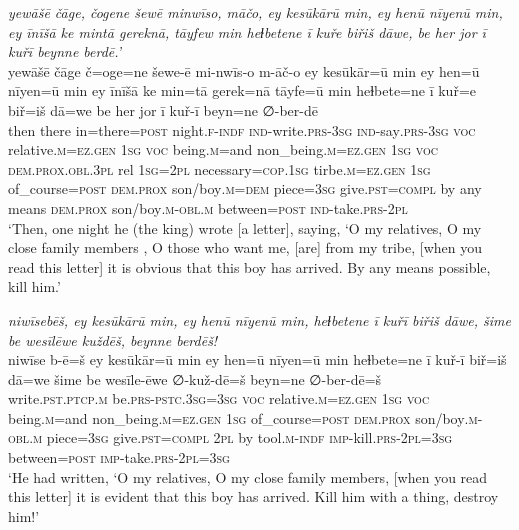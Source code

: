 \ea \label{KŠ.56}
\textit{yewāšē čāge, čogene šewē minwīso, māčo, ey kesūkārū min, ey henū nīyenū min, ey īnīšā ke mintā gereknā, tāyfew min heɫbetene ī kuře biřiš dāwe, be her jor ī kuřī beynne berdē.’} \\ 
\gll yewāšē čāge č=oge=ne šewe-ē mi-nwīs-o m-āč-o ey kesūkār=ū min ey hen=ū nīyen=ū min ey īnīšā ke min=tā gerek=nā tāyfe=ū min heɫbete=ne ī kuř=e biř=iš dā=we be her jor ī kuř-ī beyn=ne ∅-ber-dē \\ 
 then there in=there\textsc{=\textsc{post}} night\textsc{.f}\textsc{-indf} \textsc{ind-}write\textsc{.prs}\textsc{-3sg} \textsc{ind-}say\textsc{.prs}\textsc{-3sg} \textsc{voc} relative\textsc{.m}\textsc{\textsc{=ez.gen}} \textsc{1sg} \textsc{voc} being\textsc{.m}=and non\_being\textsc{.m}\textsc{\textsc{=ez.gen}} \textsc{1sg} \textsc{voc} \textsc{dem.prox}\textsc{.obl}\textsc{.3pl} rel \textsc{1sg}=\textsc{2pl} necessary\textsc{=cop}\textsc{.\textsc{1sg}} tirbe\textsc{.m}\textsc{\textsc{=ez.gen}} \textsc{1sg} of\_course\textsc{=\textsc{post}} \textsc{dem.prox} son/boy\textsc{.m}\textsc{=dem} piece\textsc{=3sg} give\textsc{.pst}\textsc{=compl} by any means \textsc{dem.prox} son/boy\textsc{.m}\textsc{-obl}\textsc{.m} between\textsc{=\textsc{post}} \textsc{ind-}take\textsc{.prs}-\textsc{2pl} \\ 
\glt `Then, one night he (the king) wrote [a letter], saying, ‘O my relatives, O my close family members , O those who want me, [are] from my tribe, [when you read this letter] it is obvious that this boy has arrived. By any means possible, kill him.'
\z 
 
\ea \label{KŠ.72}
\textit{niwīsebēš, ey kesūkārū min, ey henū nīyenū min, heɫbetene ī kuřī biřiš dāwe, šime be wesīlēwe kuždēš, beynne berdēš!} \\ 
\gll niwīse b-ē=š ey kesūkār=ū min ey hen=ū nīyen=ū min heɫbete=ne ī kuř-ī biř=iš dā=we šime be wesīle-ēwe ∅-kuž-dē=š beyn=ne ∅-ber-dē=š \\ 
 write\textsc{.pst}\textsc{.ptcp}\textsc{.m} be\textsc{.prs}\textsc{-pstc}\textsc{.3sg}\textsc{=3sg} \textsc{voc} relative\textsc{.m}\textsc{\textsc{=ez.gen}} \textsc{1sg} \textsc{voc} being\textsc{.m}=and non\_being\textsc{.m}\textsc{\textsc{=ez.gen}} \textsc{1sg} of\_course\textsc{=\textsc{post}} \textsc{dem.prox} son/boy\textsc{.m}\textsc{-obl}\textsc{.m} piece\textsc{=3sg} give\textsc{.pst}\textsc{=compl} \textsc{2pl} by tool\textsc{.m}\textsc{-indf} \textsc{imp-}kill\textsc{.prs}-\textsc{2pl}\textsc{=3sg} between\textsc{=\textsc{post}} \textsc{imp-}take\textsc{.prs}-\textsc{2pl}\textsc{=3sg} \\ 
\glt `He had written, ‘O my relatives, O my close family members, [when you read this letter] it is evident that this boy has arrived. Kill him with a thing, destroy him!'
\z 
 
